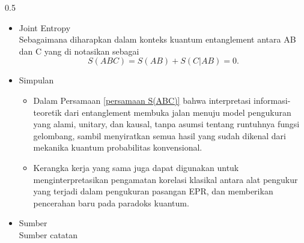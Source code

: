 \begin{frame}
\begin{columns}[T]
   \begin{column}{0.5\textwidth}
        \begin{itemize} \tiny \justifying
            \item[$\Rightarrow$] Joint Entropy\\  
                Sebagaimana diharapkan dalam konteks kuantum entanglement antara AB dan C yang di notasikan sebagai
                \begin{equation}
                    S(ABC) =S(AB) +S(C|AB) =0.
                    \label{persamaan S(ABC)}
                \end{equation}
            \item \small Simpulan\\
                \begin{itemize}\tiny \justifying
                    \item[$\Rightarrow$] Dalam Persamaan \ref{persamaan S(ABC)} bahwa interpretasi informasi-teoretik dari entanglement membuka jalan menuju model pengukuran yang alami, unitary, dan kausal, tanpa asumsi tentang runtuhnya fungsi gelombang, sambil menyiratkan semua hasil yang sudah dikenal dari mekanika kuantum probabilitas konvensional.
                    \item[$\Rightarrow$] Kerangka kerja yang sama juga dapat digunakan untuk menginterpretasikan pengamatan korelasi klasikal antara alat pengukur yang terjadi dalam pengukuran pasangan EPR, dan memberikan pencerahan baru pada paradoks kuantum.
                \end{itemize}
            \item \small Sumber\\
                \tiny Sumber catatan 
        \end{itemize}
    \end{column}
  \end{columns}   
\end{frame}


